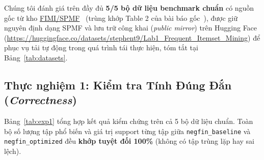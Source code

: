 \documentclass[conference]{IEEEtran}
\begin{document}
Chúng tôi đánh giá trên đầy đủ \textbf{5/5 bộ dữ liệu benchmark chuẩn} có nguồn gốc từ kho \href{https://www.philippe-fournier-viger.com/spmf/index.php?link=datasets.php}{FIMI/SPMF}~\cite{b12} (trùng khớp Table 2 của bài báo gốc~\cite{b9}), được giữ nguyên định dạng SPMF và lưu trữ công khai (\textit{public mirror}) trên Hugging Face (\url{https://huggingface.co/datasets/stephent9/Lab1_Frequent_Itemset_Mining}) để phục vụ tải tự động trong quá trình tái thực hiện, tóm tắt tại Bảng~\ref{tab:datasets}.

\begin{table}[htbp]
\caption{Đặc trưng 5 bộ dữ liệu Benchmark chuẩn SPMF sử dụng trong Chương 2}
\label{tab:datasets}
\centering
{}
\end{table}

\subsection{Thực nghiệm 1: Kiểm tra Tính Đúng Đắn (\textit{Correctness})}
Bảng~\ref{tab:exp1} tổng hợp kết quả kiểm chứng trên cả 5 bộ dữ liệu chuẩn. Toàn bộ số lượng tập phổ biến và giá trị support từng tập giữa \texttt{negfin\_baseline} và \texttt{negfin\_optimized} đều \textbf{khớp tuyệt đối 100\%} (không có tập trùng lặp hay sai lệch).

\begin{table}[H]
\caption{Kết quả Thực nghiệm 1: Kiểm tra tính đúng đắn trên 5 bộ Benchmark}
\label{tab:exp1}
\centering
{}
\end{table}
\end{document}
